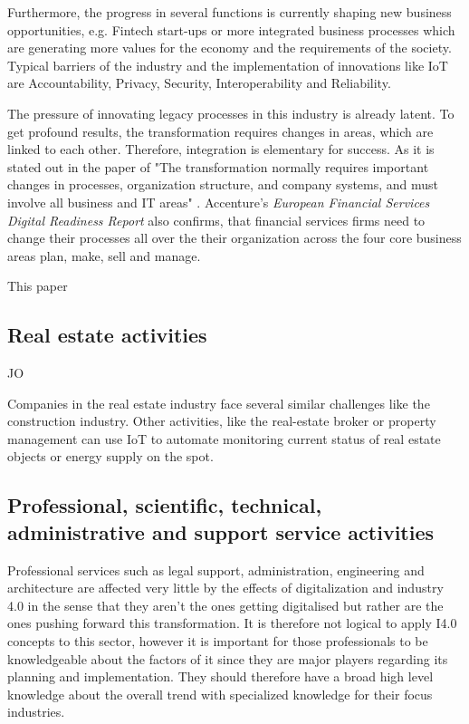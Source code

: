Furthermore, the progress in several functions is currently shaping new business opportunities, e.g. Fintech start-ups or more integrated business processes which are generating more values for the economy and the requirements of the society.
Typical barriers of the industry and the implementation of innovations like \ac{IoT} are Accountability, Privacy, Security, Interoperability and Reliability. \cite{WEF-futureFinancialServices, Weber2011133, CapGemini-IoT-financialServices} %

The pressure of innovating legacy processes in this industry is already latent. To get profound results, the transformation requires changes in areas, which are linked to each other. Therefore, integration is elementary for success. As it is stated out in the paper of \citeauthor{ArthurDLittle-FinancialService} "The transformation normally requires important changes in processes, organization structure, and company systems, and must involve all business and IT areas" \cite[p.4 ]{ArthurDLittle-FinancialService}. Accenture's \emph{European Financial Services Digital Readiness Report} also confirms, that financial services firms need to change their processes all over the their organization across the four core business areas plan, make, sell and manage. \cite[p. 9]{accenture-europeanFinancialServices-digitalReadinessReport}

This paper 

\subsection{Real estate activities}
JO

Companies in the real estate industry face several similar challenges like the construction industry. Other activities, like the real-estate broker or property management can use \ac{IoT} to automate monitoring current status of real estate objects or energy supply on the spot.

\subsection{Professional, scientific, technical, administrative and support service activities}

Professional services such as legal support, administration, engineering and architecture are affected very little by the effects of digitalization and industry 4.0 in the sense that they aren't the ones getting digitalised but rather are the ones pushing forward this transformation. It is therefore not logical to apply \ac{I4.0} concepts to this sector, however it is important for those professionals to be knowledgeable about the factors of it since they are major players regarding its planning and implementation. They should therefore have a broad high level knowledge about the overall trend with specialized knowledge for their focus industries. 

